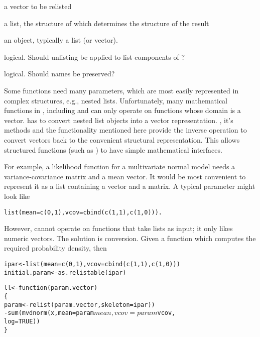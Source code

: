 %
\begin{Arguments}
\begin{ldescription}
\item[\code{flesh}] a vector to be relisted
\item[\code{skeleton}] a list, the structure of which determines the structure
of the result
\item[\code{x}] an \R{} object, typically a list (or vector).
\item[\code{recursive}] logical.  Should unlisting be applied to list
components of ?
\item[\code{use.names}] logical.  Should names be preserved?
\end{ldescription}
\end{Arguments}
%
\begin{Details}\relax
Some functions need many parameters, which are most easily represented in
complex structures, e.g., nested lists.  Unfortunately, many
mathematical functions in \R{}, including  and
 can only operate on functions whose domain is
a vector.  \R{} has  to convert nested list
objects into a vector representation.  , it's methods and
the functionality mentioned here provide the inverse operation to convert
vectors back to the convenient structural representation.
This allows structured functions (such as ) to have simple
mathematical interfaces.

For example, a likelihood function for a multivariate normal model needs a
variance-covariance matrix and a mean vector.  It would be most convenient to
represent it as a list containing a vector and a matrix.  A typical parameter
might look like
\begin{alltt}      list(mean=c(0, 1), vcov=cbind(c(1, 1), c(1, 0))).\end{alltt}

However,  cannot operate on functions that take
lists as input; it only likes numeric vectors.  The solution is
conversion. Given a function 
which computes the required probability density, then
\begin{alltt}        ipar <- list(mean=c(0, 1), vcov=cbind(c(1, 1), c(1, 0)))
        initial.param <- as.relistable(ipar)

        ll <- function(param.vector)
        \{
           param <- relist(param.vector, skeleton=ipar))
           -sum(mvdnorm(x, mean = param$mean, vcov = param$vcov,
                        log = TRUE))
        \}


\end{alltt}
\end{Details}
